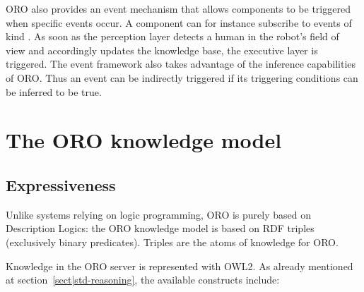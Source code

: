 ORO also provides an event mechanism that allows components to be triggered
when specific events occur. A component can for instance subscribe to events
of kind . As soon as the
perception layer detects a human in the robot's field of view and accordingly
updates the knowledge base, the executive layer is triggered. The event
framework also takes advantage of the inference capabilities of ORO. Thus an
event can be indirectly triggered if its triggering conditions can be
inferred to be true.




\section{The ORO knowledge model}
\label{sect|knowledge-model}

\subsection{Expressiveness}
\label{sect|oro-expressiveness}

Unlike systems relying on logic programming, ORO is purely
based on Description Logics: the ORO knowledge model is based on RDF triples
(\ie exclusively binary predicates). Triples 
are the atoms of knowledge for ORO.

Knowledge in the ORO server is represented with OWL2. As already mentioned at
section~\ref{sect|std-reasoning}, the available constructs include:

